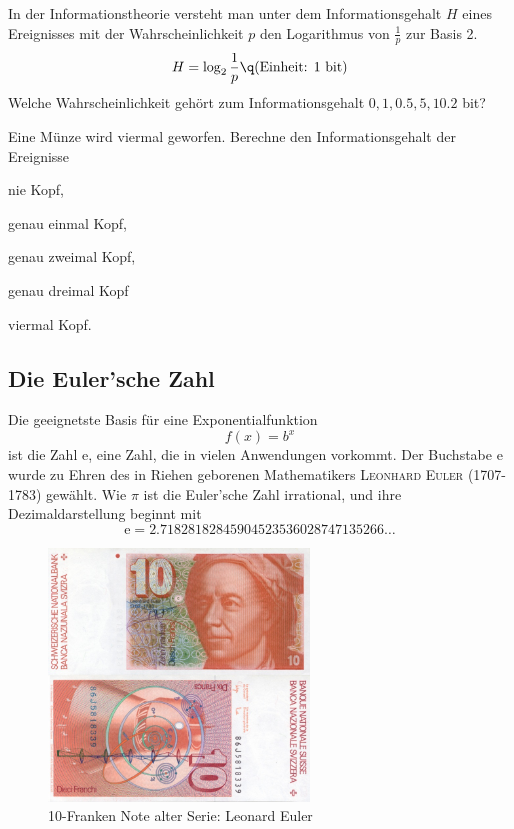 \documentclass[%
11pt,%
twoside,%
titlepage,%
german,%
headsepline%
]{scrartcl}
\newcounter{theo}[section]\setcounter{theo}{0}
\begin{document}
\begin{ueb}[Info]
In der Informationstheorie versteht man unter dem Informationsgehalt $H$ eines Ereignisses mit der Wahrscheinlichkeit $p$ den Logarithmus von $\frac{1}{p}$ zur Basis 2.
$$H = \log_2\frac{1}{p}\q\text{(Einheit: 1 bit)}$$
Welche Wahrscheinlichkeit gehört zum Informationsgehalt $0, 1,0.5,5, 10.2$ bit?

Eine Münze wird viermal geworfen. Berechne den Informationsgehalt der Ereignisse
\begin{enumeratea}
\item nie Kopf,
\item genau einmal Kopf,
\item genau zweimal Kopf,
\item genau dreimal Kopf
\item viermal Kopf.
\end{enumeratea}
\end{ueb}

\subsection{Die Euler'sche Zahl}
Die geeignetste Basis für eine Exponentialfunktion
$$f(x)=b^x$$
ist die Zahl $\mathrm{e}$, eine Zahl, die in vielen Anwendungen vorkommt. Der Buchstabe $\mathrm{e}$ wurde zu Ehren des in Riehen geborenen Mathematikers \textsc{Leonhard Euler} (1707-1783) gewählt. Wie $\pi$ ist die Euler'sche Zahl irrational, und ihre Dezimaldarstellung beginnt mit
$$\mathrm{e}  =  2.71828182845904523536028747135266\dots$$

\begin{figure}
\begin{center}
\includegraphics[width=0.618\textwidth]{pictures/euler}
\end{center}
\caption{10-Franken Note alter Serie: Leonard Euler}
\end{figure}
\end{document}
